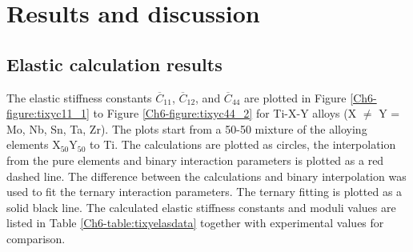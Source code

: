 \section{Results and discussion}

\subsection{Elastic calculation results}

The elastic stiffness constants $\overline{C}_{11}$, $\overline{C}_{12}$, and $\overline{C}_{44}$ are plotted in Figure \ref{Ch6-figure:tixyc11_1} to Figure \ref{Ch6-figure:tixyc44_2} for Ti-X-Y alloys (X $\neq$ Y = Mo, Nb, Sn, Ta, Zr). The plots start from a 50-50 mixture of the alloying elements X$_{50}$Y$_{50}$ to Ti. The calculations are plotted as circles, the interpolation from the pure elements and binary interaction parameters is plotted as a red dashed line. The difference between the calculations and binary interpolation was used to fit the ternary interaction parameters. The ternary fitting is plotted as a solid black line. The calculated elastic stiffness constants and moduli values are listed in Table \ref{Ch6-table:tixyelasdata} together with experimental values \cite{Niinomi2012,Mohammed2014,Nozoe2007,Geetha2009} for comparison.


